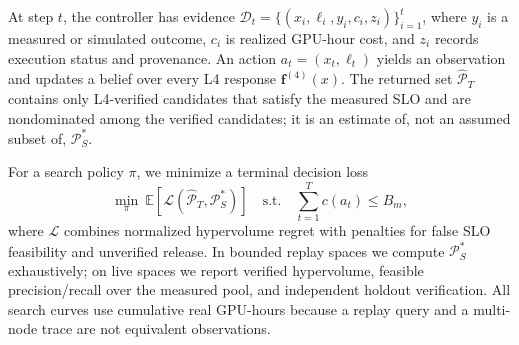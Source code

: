 At step $t$, the controller has evidence
$\mathcal D_t=\{(x_i,\ell_i,y_i,c_i,z_i)\}_{i=1}^t$, where $y_i$ is a
measured or simulated outcome, $c_i$ is realized GPU-hour cost, and $z_i$
records execution status and provenance.  An action $a_t=(x_t,\ell_t)$ yields
an observation and updates a belief over every L4 response
$\mathbf f^{(4)}(x)$.  The returned set $\widehat{\mathcal P}_T$ contains only
L4-verified candidates that satisfy the measured SLO and are nondominated among
the verified candidates; it is an estimate of, not an assumed subset of,
$\mathcal P_S^*$.

For a search policy $\pi$, we minimize a terminal decision loss
\begin{equation}
\min_{\pi}\
\mathbb E\!\left[\mathcal L
(\widehat{\mathcal P}_T,\mathcal P_S^*)\right]
\quad\text{s.t.}\quad
\sum_{t=1}^{T}c(a_t)\leq B_m,
\label{eq:budgeted-objective}
\end{equation}
where $\mathcal L$ combines normalized hypervolume regret with penalties for
false SLO feasibility and unverified release.  In bounded replay spaces we
compute $\mathcal P_S^*$ exhaustively; on live spaces we report verified
hypervolume, feasible precision/recall over the measured pool, and independent
holdout verification.  All search curves use cumulative real GPU-hours because
a replay query and a multi-node trace are not equivalent observations.
